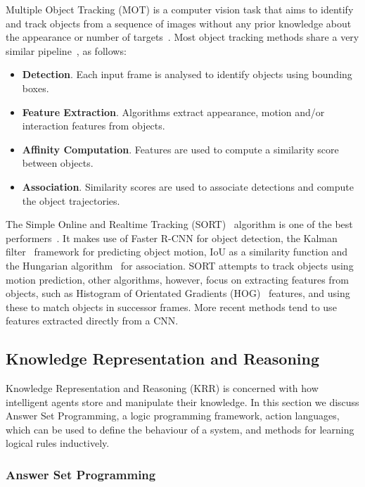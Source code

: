 \documentclass[../interim.tex]{subfiles}
\begin{document}
Multiple Object Tracking (MOT) is a computer vision task that aims to identify and track objects from a sequence of images without any prior knowledge about the appearance or number of targets~\cite{obj-tracking-survey}. Most object tracking methods share a very similar pipeline~\cite{obj-tracking-survey}, as follows:
\begin{itemize}
  \item \textbf{Detection}. Each input frame is analysed to identify objects using bounding boxes.

  \item \textbf{Feature Extraction}. Algorithms extract appearance, motion and/or interaction features from objects.

  \item \textbf{Affinity Computation}. Features are used to compute a similarity score between objects.

  \item \textbf{Association}. Similarity scores are used to associate detections and compute the object trajectories.
\end{itemize}

The Simple Online and Realtime Tracking (SORT)~\cite{sort-obj-tracking} algorithm is one of the best performers~\cite{obj-tracking-survey}. It makes use of Faster R-CNN for object detection, the Kalman filter~\cite{kalman-filter} framework for predicting object motion, IoU as a similarity function and the Hungarian algorithm~\cite{hungarian-algo} for association. SORT attempts to track objects using motion prediction, other algorithms, however, focus on extracting features from objects, such as Histogram of Orientated Gradients (HOG)~\cite{hog-features} features, and using these to match objects in successor frames. More recent methods tend to use features extracted directly from a CNN.


\subsection{Knowledge Representation and Reasoning}

Knowledge Representation and Reasoning (KRR) is concerned with how intelligent agents store and manipulate their knowledge. In this section we discuss Answer Set Programming, a logic programming framework, action languages, which can be used to define the behaviour of a system, and methods for learning logical rules inductively.

\subsubsection{Answer Set Programming}
\end{document}
